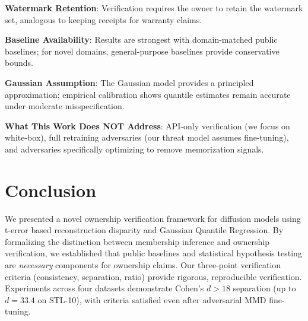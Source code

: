 \documentclass[sigconf, review, anonymous]{acmart}
\begin{document}
\textbf{Watermark Retention}: Verification requires the owner to retain the watermark set, analogous to keeping receipts for warranty claims.

\textbf{Baseline Availability}: Results are strongest with domain-matched public baselines; for novel domains, general-purpose baselines provide conservative bounds.

\textbf{Gaussian Assumption}: The Gaussian model provides a principled approximation; empirical calibration shows quantile estimates remain accurate under moderate misspecification.

\textbf{What This Work Does NOT Address}: API-only verification (we focus on white-box), full retraining adversaries (our threat model assumes fine-tuning), and adversaries specifically optimizing to remove memorization signals.

\section{Conclusion}
\label{sec:conclusion}

We presented a novel ownership verification framework for diffusion models using t-error based reconstruction disparity and Gaussian Quantile Regression.
By formalizing the distinction between membership inference and ownership verification, we established that public baselines and statistical hypothesis testing are \emph{necessary} components for ownership claims.
Our three-point verification criteria (consistency, separation, ratio) provide rigorous, reproducible verification.
Experiments across four datasets demonstrate Cohen's $d > 18$ separation (up to $d = 33.4$ on STL-10), with criteria satisfied even after adversarial MMD fine-tuning.

\begin{acks}
\end{acks}



\end{document}
